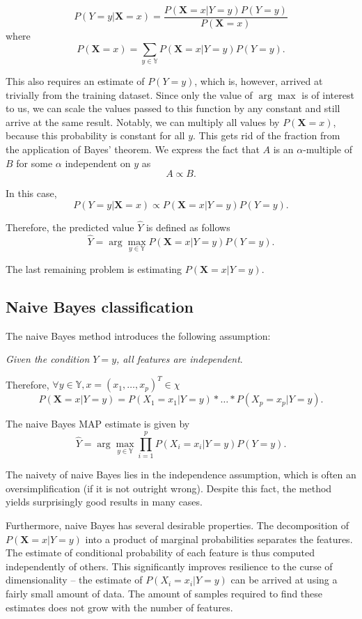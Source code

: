 \documentclass[a4paper]{article}
\begin{document}
	\[
		P(Y = y | \boldsymbol{X} = x) = \frac{P(\boldsymbol{X} = x | Y = y) P(Y = y)}{P(\boldsymbol{X} = x)}
	\]
	where
	\[
		P(\boldsymbol{X} = x) = \sum_{y \in \mathbb{Y}} P(\boldsymbol{X} = x | Y = y) P(Y = y)
	.\]

	This also requires an estimate of $P(Y = y)$, which is, however, arrived
	at trivially from the training dataset. Since only the value of $\arg \max$
	is of interest to us, we can scale the values passed to this function by
	any constant and still arrive at the same result. Notably, we can multiply
	all values by $P(\boldsymbol{X} = x)$, because this probability is constant
	for all $y$. This gets rid of the fraction from the application of Bayes'
	theorem. We express the fact that $A$ is an $\alpha$-multiple of $B$ for
	some $\alpha$ independent on $y$ as
	\[
	A \varpropto B
	.\]

	In this case,
	\[
		P(Y = y | \boldsymbol{X} = x) \varpropto P(\boldsymbol{X} = x | Y = y) P(Y = y)
	.\]

	Therefore, the predicted value $\hat{Y}$ is defined as follows
	\[
		\hat{Y} = \arg \max_{y \in \mathbb{Y}} P(\boldsymbol{X} = x | Y = y) P(Y = y)
	.\]

	The last remaining problem is estimating $P(\boldsymbol{X} = x | Y = y)$.

	\subsection{Naive Bayes classification}
	The naive Bayes method introduces the following assumption:

	\textit{Given the condition $Y = y$, all features are independent}.

	Therefore, $\forall y \in \mathbb{Y}, x = (x_1, \ldots, x_p)^T \in \chi$ 
	\[
		P(\boldsymbol{X} = x | Y = y) = P(X_1 = x_1 | Y = y) * \ldots * P(X_p = x_p | Y = y)
	.\]

	The naive Bayes MAP estimate is given by
	\[
		\hat{Y} = \arg \max_{y \in \mathbb{Y}} \prod_{i = 1}^p P(X_i = x_i | Y = y) P(Y = y)
	.\] 

	The naivety of naive Bayes lies in the independence assumption, which is
	often an oversimplification (if it is not outright wrong). Despite this
	fact, the method yields surprisingly good results in many cases.

	Furthermore, naive Bayes has several desirable properties. The decomposition
	of $P(\boldsymbol{X} = x | Y = y)$ into a product of marginal probabilities
	separates the features. The estimate of conditional probability of each feature
	is thus computed independently of others. This significantly improves
	resilience to the curse of dimensionality -- the estimate of $P(X_i = x_i | Y = y)$
	can be arrived at using a fairly small amount of data. The amount of samples
	required to find these estimates does not grow with the number of features.
\end{document}
